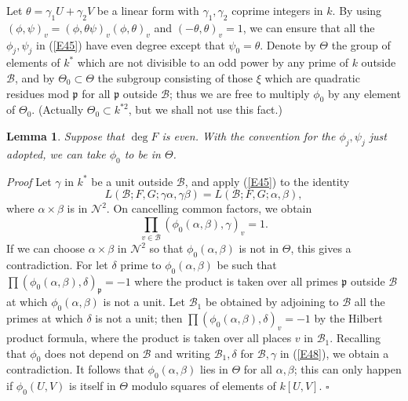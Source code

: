 \documentclass[12pt]{article}
\def\fp{{\mathfrak p}}
\def\ga{{\alpha}}
\def\gb{{\beta}}
\def\gg{{\gamma}}
\def\gd{{\delta}}
\def\gt{{\theta}}
\def\gT{{\Theta}}
\def\sB{{\mathcal B}}
\def\sN{{\mathcal N}}
\def\qed{{\hfill$\square$}}
\def\beq{\begin{equation} \label}
\def\ble{\begin{lemma} \label}
\def\ele{\end{lemma}}
\newtheorem{lemma}{Lemma}
\begin{document}
Let $\gt=\gg_1U+\gg_2V$ be a linear form with $\gg_1,\gg_2$ coprime integers
in $k$. By using $(\phi,\psi)_v=(\phi,\gt\psi)_v(\phi,\gt)_v$ and
$(-\gt,\gt)_v=1$, we can
ensure that all the $\phi_j,\psi_j$ in (\ref{E45}) have even degree except
that $\psi_0=\gt$. Denote by $\gT$ the group of elements of $k^*$ which are
not divisible to an odd power by any prime of $k$ outside $\sB$, and by
$\gT_0\subset\gT$ the subgroup consisting
of those $\xi$ which are quadratic residues mod $\fp$
for all $\fp$ outside $\sB$; thus we are free to multiply
$\phi_0$ by any element of $\gT_0$. (Actually
$\gT_0\subset k^{*2}$, but we shall not use this fact.)
\ble{L15} Suppose that $\deg F$ is even. With the convention for the
$\phi_j,\psi_j$ just adopted, we can take $\phi_0$ to be in $\gT$.
\ele
\emph{Proof} Let $\gg$ in $k^*$ be a unit outside
$\sB$, and apply (\ref{E45}) to the identity
\[ L(\sB;F,G;\gg\ga,\gg\gb)=L(\sB;F,G;\ga,\gb), \]
where $\ga\times\gb$ is in $\sN^2$. On cancelling common factors, we obtain
\beq{E48} \prod_{v\in\sB}(\phi_0(\ga,\gb),\gg)_v=1. \end{equation}
If we can choose $\ga\times\gb$ in $\sN^2$ so that
$\phi_0(\ga,\gb)$ is not in $\gT$, this gives a
contradiction. For let $\gd$
prime to $\phi_0(\ga,\gb)$ be such
that $\prod(\phi_0(\ga,\gb),\gd)_\fp=-1$ where the product is taken over all
primes $\fp$ outside $\sB$ at which $\phi_0(\ga,\gb)$ is not a unit. Let
$\sB_1$ be obtained by 
adjoining to $\sB$ all the primes at which $\gd$ is not a unit; then
$\prod(\phi_0(\ga,\gb),\gd)_v=-1$ by the Hilbert product formula, where
the product is taken over all places $v$ in $\sB_1$. Recalling that $\phi_0$
does not depend on $\sB$ and writing
$\sB_1,\gd$ for $\sB,\gg$ in (\ref{E48}), we obtain a contradiction.
It follows that $\phi_0(\ga,\gb)$ lies in $\gT$
for all $\ga,\gb$; this can
only happen if $\phi_0(U,V)$ is itself in $\gT$ modulo
squares of elements of $k[U,V]$.  \qed
\end{document}
